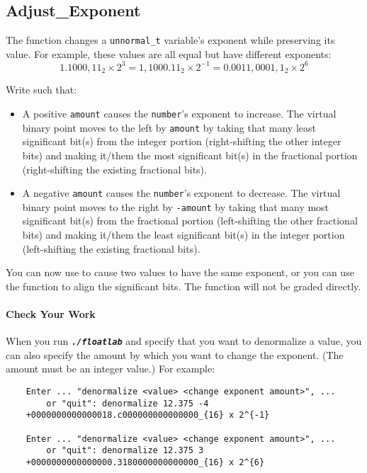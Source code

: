 \subsection{Adjust\_Exponent}

The  function changes a \lstinline{unnormal_t} variable's exponent while preserving its value.
For example, these values are all equal but have different exponents:
\[
    1.1000,11_{2} \times 2^3 = 1,1000.11_{2} \times 2^{-1} = 0.0011,0001,1_{2} \times 2^6
\]

Write  such that:
\begin{itemize}
    \item A positive \lstinline{amount} causes the \lstinline{number}'s exponent to increase.
        The virtual binary point moves to the left by \lstinline{amount} by taking that many least significant bit(s) from the integer portion (right-shifting the other integer bits) and making it/them the most significant bit(s) in the fractional portion (right-shifting the existing fractional bits).
    \item A negative \lstinline{amount} causes the \lstinline{number}'s exponent to decrease.
        The virtual binary point moves to the right by \lstinline{-amount} by taking that many most significant bit(s) from the fractional portion (left-shifting the other fractional bits) and making it/them the least significant bit(s) in the integer portion (left-shifting the existing fractional bits).
\end{itemize}

You can now use  to cause two values to have the same exponent, or you can use the function to align the significant bits.
The  function will not be graded directly.

\paragraph*{Check Your Work}

When you run \texttt{\textbf{\textit{./floatlab}}} and specify that you want to denormalize a value, you can also specify the amount by which you want to change the exponent.
(The amount must be an integer value.) For example:

\begin{verbatim}
    Enter ... "denormalize <value> <change exponent amount>", ...
        or "quit": denormalize 12.375 -4
    +0000000000000018.c000000000000000_{16} x 2^{-1}

    Enter ... "denormalize <value> <change exponent amount>", ...
        or "quit": denormalize 12.375 3
    +0000000000000000.3180000000000000_{16} x 2^{6}
\end{verbatim}

